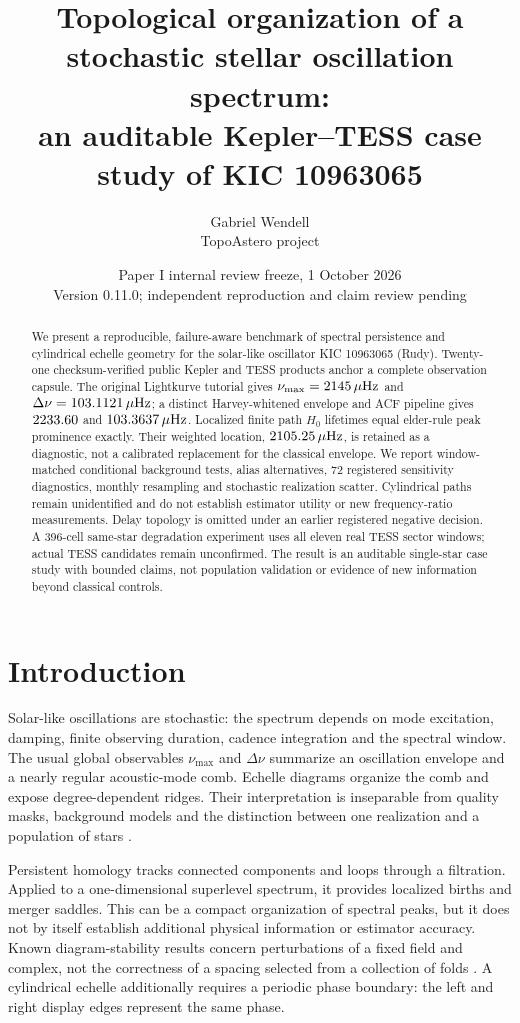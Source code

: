 \documentclass[11pt]{article}
\title{Topological organization of a stochastic stellar oscillation spectrum:\\
an auditable Kepler--TESS case study of KIC 10963065}
\author{Gabriel Wendell\\\small TopoAstero project}
\date{Paper I internal review freeze, 1 October 2026\\
\small Version 0.11.0; independent reproduction and claim review pending}
\newcommand{\numax}{\nu_{\max}}
\newcommand{\dnu}{\Delta\nu}
\begin{document}
\maketitle
\begin{abstract}
We present a reproducible, failure-aware benchmark of spectral persistence and
cylindrical echelle geometry for the solar-like oscillator KIC 10963065 (Rudy).
Twenty-one checksum-verified public Kepler and TESS products anchor a complete
observation capsule. The original Lightkurve tutorial gives
$\numax=\TutorialNumax\,\mu{\rm Hz}$ and
$\dnu=\TutorialDnu\,\mu{\rm Hz}$; a distinct Harvey-whitened envelope and ACF
pipeline gives $2233.60$ and $103.3637\,\mu{\rm Hz}$.
Localized finite path $H_0$ lifetimes equal elder-rule peak prominence exactly.
Their weighted location, $2105.25\,\mu{\rm Hz}$, is retained as a diagnostic,
not a calibrated replacement for the classical envelope. We report window-matched
conditional background tests, alias alternatives, 72 registered sensitivity
diagnostics, monthly resampling and stochastic realization scatter.
Cylindrical paths remain unidentified and do not establish estimator utility or
new frequency-ratio measurements. Delay topology is omitted under an earlier
registered negative decision. A 396-cell same-star degradation experiment uses
all eleven real TESS sector windows; actual TESS candidates remain unconfirmed.
The result is an auditable single-star case study with bounded claims, not
population validation or evidence of new information beyond classical controls.
\end{abstract}

\section{Introduction}
Solar-like oscillations are stochastic: the spectrum depends on mode excitation,
damping, finite observing duration, cadence integration and the spectral window.
The usual global observables $\numax$ and $\dnu$ summarize an oscillation envelope
and a nearly regular acoustic-mode comb. Echelle diagrams organize the comb and
expose degree-dependent ridges. Their interpretation is inseparable from quality
masks, background models and the distinction between one realization and a
population of stars \citep{Lund2017,SilvaAguirre2017}.

Persistent homology tracks connected components and loops through a filtration.
Applied to a one-dimensional superlevel spectrum, it provides localized births
and merger saddles. This can be a compact organization of spectral peaks, but it
does not by itself establish additional physical information or estimator accuracy.
Known diagram-stability results concern perturbations of a fixed field and complex,
not the correctness of a spacing selected from a collection of folds
\citep{CohenSteiner2007}. A cylindrical echelle additionally requires a periodic
phase boundary: the left and right display edges represent the same phase.
\end{document}
